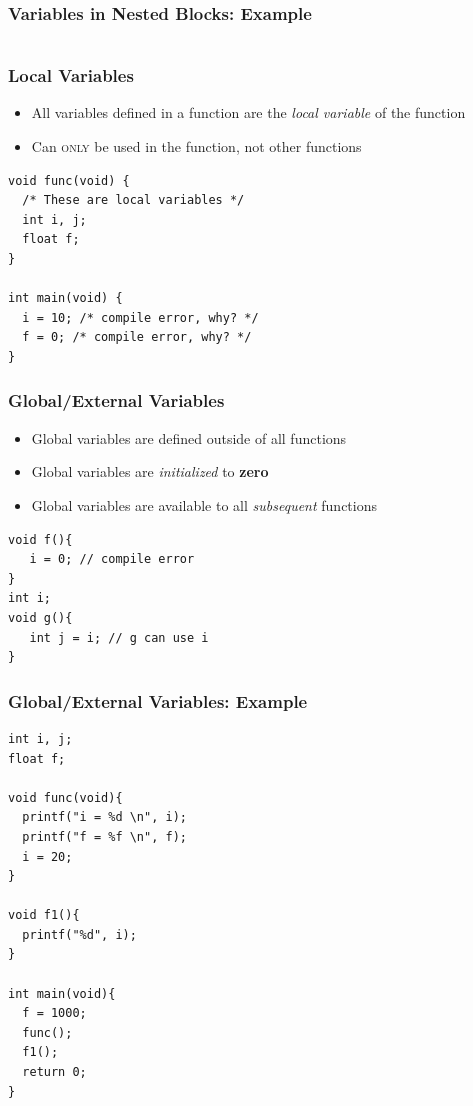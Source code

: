 \documentclass{../c-lecture}
\begin{document}
\begin{frame}
  \frametitle{Variables in Nested Blocks: Example}
  \scriptsize
  \inputminted[bgcolor=Black]{c}{./src/scope.c}
\end{frame}

\begin{frame}[fragile]
  \frametitle{Local Variables}
  \begin{itemize}
    \item
      All variables defined in a function are the
      \textit{\color{YellowOrange} local variable} of the function
    \item
      Can \textsc{\color{LimeGreen} only} be used in the function, not other
      functions
  \end{itemize}
  \scriptsize
  \begin{verbatim}
void func(void) {
  /* These are local variables */
  int i, j;
  float f;
}

int main(void) {
  i = 10; /* compile error, why? */
  f = 0; /* compile error, why? */
}
  \end{verbatim}
\end{frame}

\begin{frame}[fragile]
  \frametitle{Global/External Variables}
  \begin{itemize}
    \item Global variables are defined outside of all functions
    \item
      Global variables are \textit{\color{Cyan} initialized} to
      \textbf{\color{ProcessBlue} zero}
    \item
      Global variables are available to all
      \textit{\color{LimeGreen} subsequent} functions
  \end{itemize}
  \scriptsize
  \begin{verbatim}
void f(){
   i = 0; // compile error
}
int i;
void g(){
   int j = i; // g can use i
}
  \end{verbatim}
\end{frame}

\begin{frame}[fragile]
  \frametitle{Global/External Variables: Example}
  \scriptsize
  \begin{verbatim}
int i, j;
float f;

void func(void){
  printf("i = %d \n", i);
  printf("f = %f \n", f);
  i = 20;
}

void f1(){
  printf("%d", i);
}

int main(void){
  f = 1000;
  func();
  f1();
  return 0;
}
  \end{verbatim}
\end{frame}
\end{document}
